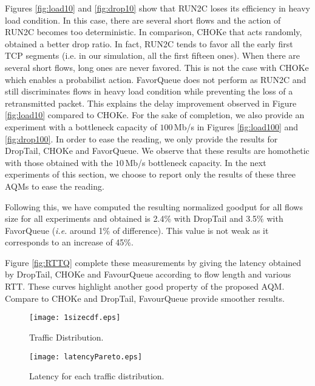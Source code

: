 \documentclass{elsart}
\begin{document}
Figures \ref{fig:load10} and \ref{fig:drop10} show that RUN2C loses its efficiency in heavy load condition. In this case, there are several short flows and the action of RUN2C becomes too deterministic. In comparison, CHOKe that acts randomly, obtained a better drop ratio. 
In fact, RUN2C tends to favor all the early first TCP segments (i.e. in our simulation, all the first fifteen ones). When there are several short flows, long ones are never favored. This is not the case with CHOKe which enables a probabilist action.
FavorQueue does not perform as RUN2C and still discriminates flows in heavy load condition while preventing the loss of a retransmitted packet. This explains the delay improvement observed in Figure \ref{fig:load10} compared to CHOKe.
For the sake of completion, we also provide an experiment with a bottleneck capacity of $100$\,Mb/s in Figures \ref{fig:load100} and \ref{fig:drop100}. In order to ease the reading, we only provide the results for DropTail, CHOKe and FavorQueue. We observe that these results are homothetic with those obtained with the $10$\,Mb/s bottleneck capacity. In the next experiments of this section, we choose to report only the results of these three AQMs to ease the reading.

Following this, we have computed the resulting normalized goodput for all flows size for all experiments and obtained is 2.4\% with DropTail and 3.5\% with FavorQueue (\textit{i.e.} around 1\% of difference). This value is not weak as it corresponds to an increase of 45\%.

Figure \ref{fig:RTTQ} complete these measurements by giving the latency obtained by DropTail, CHOKe and FavourQueue according to flow length and various RTT. These curves highlight another good property of the proposed AQM. Compare to CHOKe and DropTail, FavourQueue provide smoother results. 

\begin{figure}[htb!]
   \begin{minipage}[b]{1.0\columnwidth}
	\centering
	\texttt{[image: 1sizecdf.eps]}
	\caption{Traffic Distribution.}
	\label{fig:size-dist}
   \end{minipage}\hfill

   \begin{minipage}[b]{1.0\columnwidth}   
	\centering
	\texttt{[image: latencyPareto.eps]}
	\caption{Latency for each traffic distribution.}
	\label{fig:lat-dist}
   \end{minipage}
   \label{fig:dist}
\end{figure}
\end{document}
